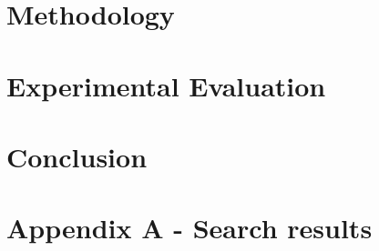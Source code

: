 \documentclass[sigconf]{acmart}
\begin{document}
	
	\section{Methodology}
	\label{sec:method}
	
	
	
	\section{Experimental Evaluation}
	\label{sec:evaluation}
	
	
	
	\section{Conclusion}
	\label {sec:conclusion}
	
	
	
	
	
	
	
	
	


    \newpage
    \section{Appendix A - Search results}
    \label{sec:appendixA}
    
\end{document}
